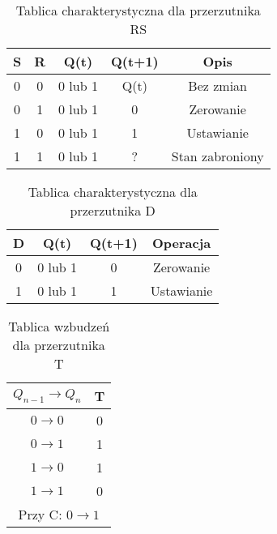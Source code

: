 \documentclass[12pt,a4paper]{article}
\begin{document}
	\begin{table}[!h]
		\centering
		\begin{tabular}{|c|c|c|c|c|}
			\hline
			\textbf{S} & \textbf{R} & \textbf{Q(t)} & \textbf{Q(t+1)} & \textbf{Opis}   \\ \hline
			0          & 0          & 0 lub 1       & Q(t)            & Bez zmian       \\ \hline
			0          & 1          & 0 lub 1       & 0               & Zerowanie       \\ \hline
			1          & 0          & 0 lub 1       & 1               & Ustawianie      \\ \hline
			1          & 1          & 0 lub 1       & ?               & Stan zabroniony \\ \hline
		\end{tabular}
		\caption{Tablica charakterystyczna dla przerzutnika RS}
	\end{table}

	\begin{table}[!h]
		\centering
		\begin{tabular}{|c|c|c|c|}
			\hline
			\textbf{D} & \textbf{Q(t)} & \textbf{Q(t+1)} & \textbf{Operacja} \\ \hline
			0          & 0 lub 1       & 0               & Zerowanie         \\ \hline
			1          & 0 lub 1       & 1               & Ustawianie        \\ \hline
		\end{tabular}
		\caption{Tablica charakterystyczna dla przerzutnika D}
	\end{table}

	\begin{table}[!h]
		\centering
		\begin{tabular}{|c|c|}
			\hline
			\textbf{$Q_{n-1} \rightarrow Q_n$} & \textbf{T} \\ \hline
			$0 \rightarrow 0$	& 0           \\ \hline
			$0 \rightarrow 1$	& 1           \\ \hline
			$1 \rightarrow 0$	& 1           \\ \hline
			$1 \rightarrow 1$	& 0           \\ \hline
			\multicolumn{2}{|c|}{Przy C: $0 \rightarrow 1$}            \\ \hline
		\end{tabular}
		\caption{Tablica wzbudzeń dla przerzutnika T}
	\end{table}
\end{document}
